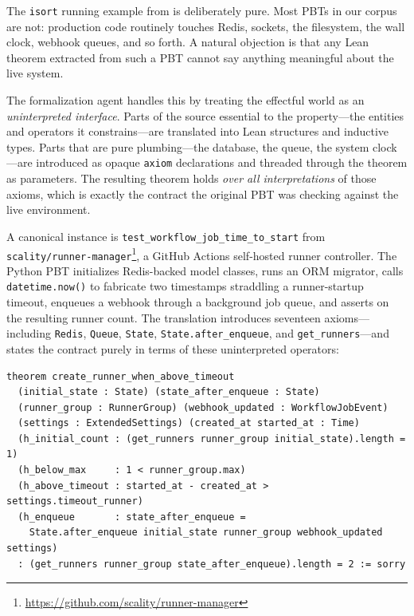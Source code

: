 The \texttt{isort} running example from  is deliberately pure. Most PBTs in our corpus are not: production code routinely touches Redis, sockets, the filesystem, the wall clock, webhook queues, and so forth. A natural objection is that any Lean theorem extracted from such a PBT cannot say anything meaningful about the live system.

The formalization agent handles this by treating the effectful world as an \emph{uninterpreted interface}. Parts of the source essential to the property---the entities and operators it constrains---are translated into Lean structures and inductive types. Parts that are pure plumbing---the database, the queue, the system clock---are introduced as opaque \texttt{axiom} declarations and threaded through the theorem as parameters. The resulting theorem holds \emph{over all interpretations} of those axioms, which is exactly the contract the original PBT was checking against the live environment.

A canonical instance is \texttt{test\_workflow\_job\_time\_to\_start} from \texttt{scality/runner-manager}\footnote{\url{https://github.com/scality/runner-manager}}, a GitHub Actions self-hosted runner controller. The Python PBT initializes Redis-backed model classes, runs an ORM migrator, calls \texttt{datetime.now()} to fabricate two timestamps straddling a runner-startup timeout, enqueues a webhook through a background job queue, and asserts on the resulting runner count. The \FVSpec translation introduces seventeen axioms---including \texttt{Redis}, \texttt{Queue}, \texttt{State}, \texttt{State.after\_enqueue}, and \texttt{get\_runners}---and states the contract purely in terms of these uninterpreted operators:

\begin{lstlisting}[style=code, language=Lean, basicstyle=\ttfamily\scriptsize]
theorem create_runner_when_above_timeout
  (initial_state : State) (state_after_enqueue : State)
  (runner_group : RunnerGroup) (webhook_updated : WorkflowJobEvent)
  (settings : ExtendedSettings) (created_at started_at : Time)
  (h_initial_count : (get_runners runner_group initial_state).length = 1)
  (h_below_max     : 1 < runner_group.max)
  (h_above_timeout : started_at - created_at > settings.timeout_runner)
  (h_enqueue       : state_after_enqueue =
    State.after_enqueue initial_state runner_group webhook_updated settings)
  : (get_runners runner_group state_after_enqueue).length = 2 := sorry
\end{lstlisting}

